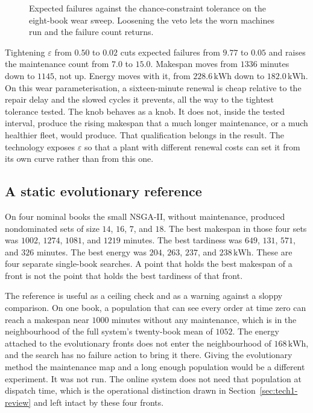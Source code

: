 \begin{figure}[ht]
\centering
{}
\caption{Expected failures against the chance-constraint tolerance on the eight-book wear sweep. Loosening the veto lets the worn machines run and the failure count returns.}
\label{fig:eps}
\end{figure}

Tightening \(\varepsilon\) from \(0.50\) to \(0.02\) cuts expected failures from \(9.77\) to \(0.05\) and raises the maintenance count from \(7.0\) to \(15.0\). Makespan moves from \(1336\) minutes down to \(1145\), not up. Energy moves with it, from \(228.6\,\mathrm{kWh}\) down to \(182.0\,\mathrm{kWh}\). On this wear parameterisation, a sixteen-minute renewal is cheap relative to the repair delay and the slowed cycles it prevents, all the way to the tightest tolerance tested. The knob behaves as a knob. It does not, inside the tested interval, produce the rising makespan that a much longer maintenance, or a much healthier fleet, would produce. That qualification belongs in the result. The technology exposes \(\varepsilon\) so that a plant with different renewal costs can set it from its own curve rather than from this one.

\subsection{A static evolutionary reference}

On four nominal books the small NSGA-II, without maintenance, produced nondominated sets of size \(14\), \(16\), \(7\), and \(18\). The best makespan in those four sets was \(1002\), \(1274\), \(1081\), and \(1219\) minutes. The best tardiness was \(649\), \(131\), \(571\), and \(326\) minutes. The best energy was \(204\), \(263\), \(237\), and \(238\,\mathrm{kWh}\). These are four separate single-book searches. A point that holds the best makespan of a front is not the point that holds the best tardiness of that front.

The reference is useful as a ceiling check and as a warning against a sloppy comparison. On one book, a population that can see every order at time zero can reach a makespan near \(1000\) minutes without any maintenance, which is in the neighbourhood of the full system's twenty-book mean of \(1052\). The energy attached to the evolutionary fronts does not enter the neighbourhood of \(168\,\mathrm{kWh}\), and the search has no failure action to bring it there. Giving the evolutionary method the maintenance map and a long enough population would be a different experiment. It was not run. The online system does not need that population at dispatch time, which is the operational distinction drawn in Section~\ref{sec:tech1-review} and left intact by these four fronts.

